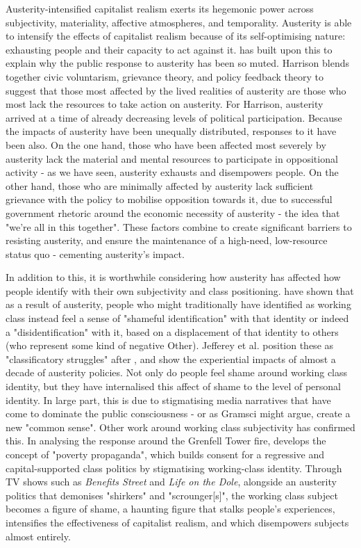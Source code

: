 Austerity-intensified capitalist realism exerts its hegemonic power across subjectivity, materiality, affective atmospheres, and temporality. Austerity is able to intensify the effects of capitalist realism because of its self-optimising nature: exhausting people and their capacity to act against it. \citet{harrison_cant_2020} has built upon this to explain why the public response to austerity has been so muted. Harrison blends together civic voluntarism, grievance theory, and policy feedback theory to suggest that those most affected by the lived realities of austerity are those who most lack the resources to take action on austerity. For Harrison, austerity arrived at a time of already decreasing levels of political participation. Because the impacts of austerity have been unequally distributed, responses to it have been also. On the one hand, those who have been affected most severely by austerity lack the material and mental resources to participate in oppositional activity - as we have seen, austerity exhausts and disempowers people. On the other hand, those who are minimally affected by austerity lack sufficient grievance with the policy to mobilise opposition towards it, due to successful government rhetoric around the economic necessity of austerity - the idea that "we're all in this together". These factors combine to create significant barriers to resisting austerity, and ensure the maintenance of a high-need, low-resource status quo - cementing austerity's impact.

In addition to this, it is worthwhile considering how austerity has affected how people identify with their own subjectivity and class positioning. \citet[p. 128]{jeffery_classificatory_2019}  have shown that as a result of austerity, people who might traditionally have identified as working class instead feel a sense of "shameful identification" with that identity or indeed a "disidentification" with it, based on a displacement of that identity to others (who represent some kind of negative Other). Jefferey et al. position these as "classificatory struggles" after \citet{tyler_classificatory_2015}, and show the experiential impacts of almost a decade of austerity policies. Not only do people feel shame around working class identity, but they have internalised this affect of shame to the level of personal identity. In large part, this is due to stigmatising media narratives that have come to dominate the public consciousness - or as Gramsci might argue, create a new "common sense". Other work around working class subjectivity has confirmed this. In analysing the response around the Grenfell Tower fire, \citet[p. 783]{shildrick_lessons_2018} develops the concept of "poverty propaganda", which builds consent for a regressive and capital-supported class politics by stigmatising working-class identity. Through TV shows such as \emph{Benefits Street} and \emph{Life on the Dole}, alongside an austerity politics that demonises "shirkers" and "scrounger[s]", the working class subject becomes a figure of shame, a haunting figure that stalks people's experiences, intensifies the effectiveness of capitalist realism, and which disempowers subjects almost entirely.

